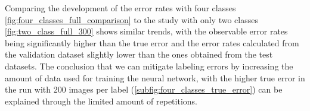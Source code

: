 \documentclass[a4paper,11pt]{scrartcl}
\theoremstyle{definition}
\begin{document}
Comparing the development of the error rates with four classes \autoref{fig:four_classes_full_comparison} to the study with only two classes \autoref{fig:two_class_full_300} shows similar trends, with the observable error rates being significantly higher than the true error and the error rates calculated from the validation dataset slightly lower than the ones obtained from the test datasets.
The conclusion that we can mitigate labeling errors by increasing the amount of data used for training the neural network, with the higher true error in the run with 200 images per label (\autoref{subfig:four_classes_true_error}) can be explained through the limited amount of repetitions.
\end{document}
